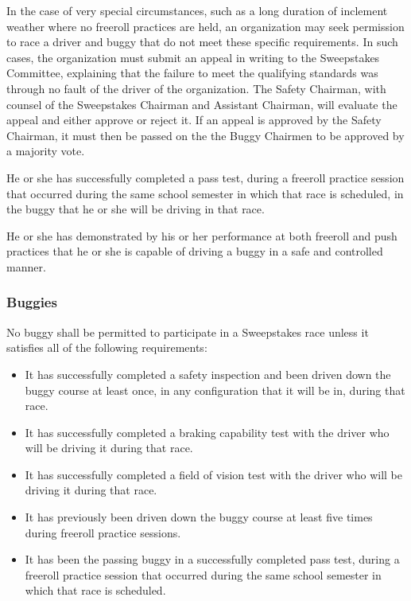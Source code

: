 	In the case of very special circumstances, such as a long duration of inclement
	weather where no freeroll practices are held, an organization may seek
	permission to race a driver and buggy that do not meet these specific
	requirements. In such cases, the organization must submit an appeal in writing
	to the Sweepstakes Committee, explaining that the failure to meet the
	qualifying standards was through no fault of the driver of the organization.
	The Safety Chairman, with counsel of the Sweepstakes Chairman and Assistant
	Chairman, will evaluate the appeal and either approve or reject it. If an
	appeal is approved by the Safety Chairman, it must then be passed on the the
	Buggy Chairmen to be approved by a majority vote.

	He or she has successfully completed a pass test, during a freeroll practice
	session that occurred during the same school semester in which that race is
	scheduled, in the buggy that he or she will be driving in that race.

	He or she has demonstrated by his or her performance at both freeroll and push
	practices that he or she is capable of driving a buggy in a safe and controlled
	manner.

\subsubsection{Buggies}

	No buggy shall be permitted to participate in a Sweepstakes race unless it
	satisfies all of the following requirements:

	\begin{itemize}

		\item It has successfully completed a safety inspection and been driven
		down the buggy course at least once, in any configuration that it will be in,
		during that race.

		\item It has successfully completed a braking capability test with the
		driver who will be driving it during that race.

		\item It has successfully completed a field of vision test with the
		driver who will be driving it during that race.

		\item It has previously been driven down the buggy course at least five
		times during freeroll practice sessions.

		\item It has been the passing buggy in a successfully completed pass
		test, during a freeroll practice session that occurred during the same school
		semester in which that race is scheduled.

	\end{itemize}

